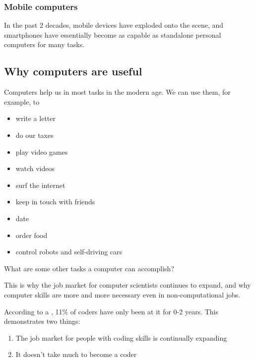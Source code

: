 \documentclass[letterpaper,10pt,english,openany,oneside]{sphinxmanual}
\begin{document}
\subsubsection{Mobile computers}
\label{\detokenize{introduction:mobile-computers}}
In the past 2 decades, mobile devices have exploded onto the scene, and smartphones have essentially become as capable as standalone personal computers for many tasks.


\subsection{Why computers are useful}
\label{\detokenize{introduction:why-computers-are-useful}}
Computers help us in most tasks in the modern age. We can use them, for example, to
\begin{itemize}
\item {} 
write a letter

\item {} 
do our taxes

\item {} 
play video games

\item {} 
watch videos

\item {} 
surf the internet

\item {} 
keep in touch with friends

\item {} 
date

\item {} 
order food

\item {} 
control robots and self-driving cars

\end{itemize}

 What are some other tasks a computer can accomplish?

This is why the job market for computer scientists continues to expand, and why computer skills are more and more necessary even in non-computational jobs.

According to a , 11\% of coders have only been at it for 0-2 years. This demonstrates two things:
\begin{enumerate}
\def\theenumi{\arabic{enumi}}
\def\labelenumi{\theenumi .}
\makeatletter\def\p@enumii{\p@enumi \theenumi .}\makeatother
\item {} 
The job market for people with coding skills is continually expanding

\item {} 
It doesn’t take much to become a coder

\end{enumerate}
\end{document}
